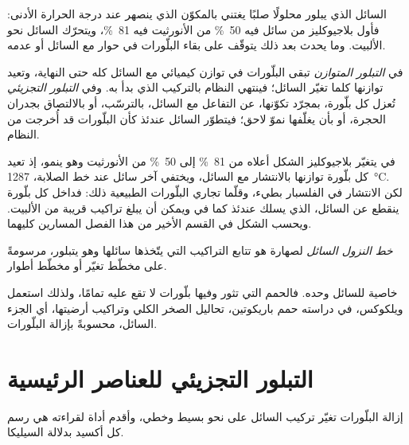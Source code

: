 السائل الذي يبلور محلولًا صلبًا يغتني بالمكوّن الذي
ينصهر عند درجة الحرارة الأدنى: فأول بلاجيوكليز من سائل فيه
\qty{50}{\percent} من الأنورثيت فيه \qty{81}{\percent}، ويتحرّك السائل نحو
الألبيت. وما يحدث بعد ذلك يتوقّف على بقاء البلّورات في حوار مع
السائل أو عدمه.

\begin{definition}
\label{def:b2:magmatic-differentiation:crystallisation}
في \emph{التبلور المتوازن} تبقى
البلّورات في توازن كيميائي مع السائل كله حتى
النهاية، وتعيد توازنها كلما تغيّر السائل؛ فينتهي النظام بالتركيب
الذي بدأ به. وفي \emph{التبلور التجزيئي} تُعزل كل بلّورة، بمجرّد تكوّنها، عن التفاعل مع
السائل، بالترسّب، أو بالالتصاق بجدران الحجرة، أو بأن
يغلّفها نموّ لاحق؛ فيتطوّر السائل عندئذ كأن البلّورات قد
أُخرجت من النظام.
\end{definition}

في  يتغيّر بلاجيوكليز الشكل أعلاه من
\qty{81}{\percent} إلى \qty{50}{\percent} من الأنورثيت وهو ينمو، إذ تعيد كل بلّورة
توازنها بالانتشار مع السائل، ويختفي آخر سائل عند
خط الصلابة، \qty{1287}{\celsius}. لكن الانتشار في الفلسبار بطيء،
وقلّما تجاري البلّورات الطبيعية ذلك: فداخل كل بلّورة ينقطع عن السائل،
الذي يسلك عندئذ كما في  ويمكن أن يبلغ تراكيب
قريبة من الألبيت. ويحسب الشكل في القسم الأخير من هذا الفصل المسارين كليهما.

\begin{definition}\label{def:b2:magmatic-differentiation:lld}
\emph{خط النزول السائل} لصهارة هو
تتابع التراكيب التي يتّخذها سائلها وهو يتبلور، مرسومةً على
مخطّط تغيّر أو مخطّط أطوار.
\end{definition}

 خاصية للسائل وحده. فالحمم التي تثور وفيها
بلّورات لا تقع عليه تمامًا، ولذلك استعمل ويلكوكس، في دراسته حمم
باريكوتين، تحاليل الصخر الكلي وتراكيب
أرضيتها، أي الجزء السائل، محسوبةً بإزالة البلّورات.

\section{التبلور التجزيئي للعناصر الرئيسية}\label{sec:b2:magmatic-differentiation:majors}

إزالة البلّورات تغيّر تركيب السائل على نحو بسيط وخطي،
وأقدم أداة لقراءته هي رسم كل أكسيد بدلالة السيليكا.

